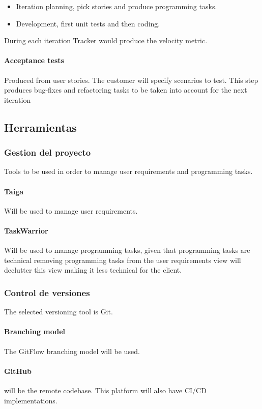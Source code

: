 \begin{itemize}
    \item Iteration planning, pick stories and produce programming tasks.
    \item Development, first unit tests and then coding.
\end{itemize}

During each iteration Tracker would produce the velocity metric.

\paragraph{Acceptance tests} Produced from user stories.
The customer will specify scenarios to test. This step produces bug-fixes and refactoring tasks to be taken into account for the next iteration

\subsection{Herramientas}
\subsubsection{Gestion del proyecto}
Tools to be used in order to manage user requirements and programming tasks.

\paragraph{Taiga} Will be used to manage user requirements.

\paragraph{TaskWarrior} Will be used to manage programming tasks, given that programming tasks are technical removing programming tasks from the user requirements view will declutter this view making it less technical for the client.

\subsubsection{Control de versiones}

The selected versioning tool is Git.

\paragraph{Branching model} The GitFlow branching model will be used.

\paragraph{GitHub} will be the remote codebase. This platform will also have CI/CD implementations.
